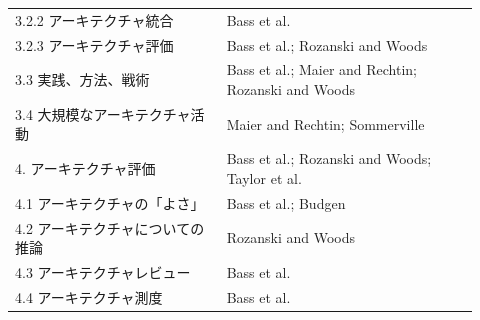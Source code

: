 \begin{longtable}{P{0.42\linewidth}P{0.50\linewidth}}
3.2.2 アーキテクチャ統合 & Bass et al. \\
3.2.3 アーキテクチャ評価 & Bass et al.; Rozanski and Woods \\
3.3 実践、方法、戦術 & Bass et al.; Maier and Rechtin; Rozanski and Woods \\
3.4 大規模なアーキテクチャ活動 & Maier and Rechtin; Sommerville \\
4. アーキテクチャ評価 & Bass et al.; Rozanski and Woods; Taylor et al. \\
4.1 アーキテクチャの「よさ」 & Bass et al.; Budgen \\
4.2 アーキテクチャについての推論 & Rozanski and Woods \\
4.3 アーキテクチャレビュー & Bass et al. \\
4.4 アーキテクチャ測度 & Bass et al. \\
\bottomrule
\end{longtable}
